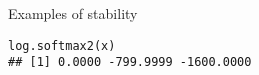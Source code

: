 \documentclass[11pt,compress,t,notes=noshow, xcolor=table]{beamer}
\begin{document}
\begin{vbframe}{Examples of stability}
\begin{verbatim}
log.softmax2(x)
## [1] 0.0000 -799.9999 -1600.0000
\end{verbatim}

\normalsize

%

%
%








\end{vbframe}
\end{document}
